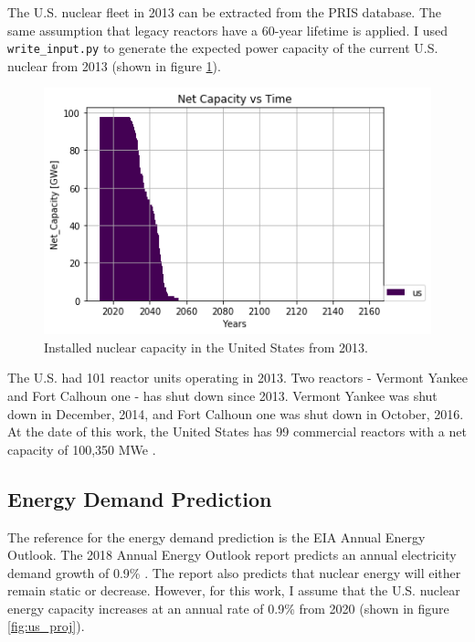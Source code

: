 The U.S. nuclear fleet in 2013 can be extracted from the \gls{PRIS} database.
The same assumption that legacy reactors have a 60-year lifetime is applied.
I used \texttt{write\_input.py} to generate the expected power capacity
of the current U.S. nuclear from 2013 (shown in figure \ref{fig:us_legacy}).

\begin{figure}[htbp!]
	\begin{center}
		\includegraphics[scale=0.6]{./images/us/legacy_power.png}
	\end{center}
	\caption{Installed nuclear capacity in the United States from 2013.}
	\label{fig:us_legacy}
\end{figure}

The U.S. had 101 reactor units operating in 2013. Two reactors -
Vermont Yankee and Fort Calhoun one - has shut down since 2013.
Vermont Yankee was shut down in December, 2014, and Fort
Calhoun one was shut down in October, 2016. At the date of this
work, the United States has 99 commercial reactors with a 
net capacity of 100,350 \gls{MWe} \cite{iaea_nuclear_2017}.

\subsection{Energy Demand Prediction}
The reference for the energy demand prediction is the 
\gls{EIA} Annual Energy Outlook.
The 2018 Annual Energy Outlook report predicts an annual electricity demand growth
of 0.9\% \cite{u.s._annual_2018}. The report also predicts that nuclear
energy will either remain static or decrease. However, for this work,
I assume that the U.S. nuclear energy capacity increases at an annual
rate of 0.9\% from 2020 (shown in figure \ref{fig:us_proj}).

